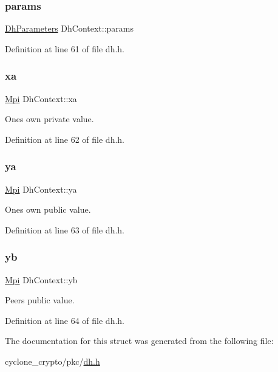 \subsubsection{\texorpdfstring{params}{params}}
{\footnotesize\ttfamily \hyperlink{structDhParameters}{Dh\+Parameters} Dh\+Context\+::params}



Definition at line 61 of file dh.\+h.

\mbox{\label{structDhContext_a3ceed075dd7b13ffe3fac2c5cbe7bde2}} 
\subsubsection{\texorpdfstring{xa}{xa}}
{\footnotesize\ttfamily \hyperlink{structMpi}{Mpi} Dh\+Context\+::xa}



One\textquotesingle{}s own private value. 



Definition at line 62 of file dh.\+h.

\mbox{\label{structDhContext_a50340bb658bc72754cd25ccfcc53c619}} 
\subsubsection{\texorpdfstring{ya}{ya}}
{\footnotesize\ttfamily \hyperlink{structMpi}{Mpi} Dh\+Context\+::ya}



One\textquotesingle{}s own public value. 



Definition at line 63 of file dh.\+h.

\mbox{\label{structDhContext_a4b1597110a34d09fea578a71a564ac3e}} 
\subsubsection{\texorpdfstring{yb}{yb}}
{\footnotesize\ttfamily \hyperlink{structMpi}{Mpi} Dh\+Context\+::yb}



Peer\textquotesingle{}s public value. 



Definition at line 64 of file dh.\+h.



The documentation for this struct was generated from the following file\+:\begin{DoxyCompactItemize}
\item 
cyclone\+\_\+crypto/pkc/\hyperlink{dh_8h}{dh.\+h}\end{DoxyCompactItemize}
